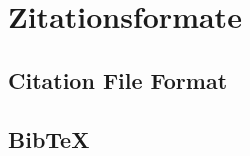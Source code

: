 \section{Zitationsformate}
\label{sec:zitationsformate}
\subsection{Citation File Format}
\label{subsec:citation-file-format}
\subsection{BibTeX}
\label{subsec:bibtex_format}
